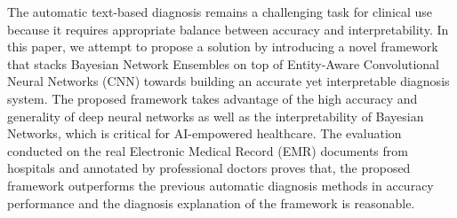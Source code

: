 The automatic text-based diagnosis remains a challenging task for clinical use because it requires appropriate balance between accuracy and interpretability. In this paper, we attempt to propose a solution by introducing a novel framework that stacks Bayesian Network Ensembles on top of Entity-Aware Convolutional Neural Networks (CNN) towards building an accurate yet interpretable diagnosis system. The proposed framework takes advantage of the high accuracy and generality of deep neural networks as well as the interpretability of Bayesian Networks, which is critical for AI-empowered healthcare. The evaluation conducted on the real Electronic Medical Record (EMR) documents from hospitals and annotated by professional doctors proves that, the proposed framework outperforms the previous automatic diagnosis methods in accuracy performance and the diagnosis explanation of the framework is reasonable.
